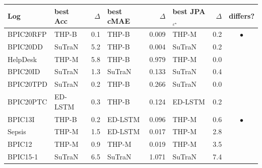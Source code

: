 \begin{tabular}{llrlrlrc}
\toprule
Log & best Acc & $\Delta$ & best cMAE & $\Delta$ & best JPA$_{\varepsilon^\star}$ & $\Delta$ & differs? \\
\midrule
BPIC20RFP & THP-B & 0.1 & THP-B & 0.009 & THP-M & 0.2 & $\bullet$ \\
BPIC20DD & SuTraN & 5.2 & THP-B & 0.004 & SuTraN & 0.2 &  \\
HelpDesk & THP-M & 5.8 & THP-B & 0.979 & THP-M & 0.0 &  \\
BPIC20ID & SuTraN & 1.3 & SuTraN & 0.133 & SuTraN & 0.4 &  \\
BPIC20TPD & SuTraN & 0.2 & THP-B & 0.266 & SuTraN & 0.0 &  \\
BPIC20PTC & ED-LSTM & 0.3 & THP-B & 0.124 & ED-LSTM & 0.2 &  \\
BPIC13I & THP-B & 0.2 & ED-LSTM & 0.096 & THP-M & 0.6 & $\bullet$ \\
Sepsis & THP-M & 1.5 & ED-LSTM & 0.017 & THP-M & 2.8 &  \\
BPIC12 & THP-M & 0.9 & THP-M & 0.019 & THP-M & 3.5 &  \\
BPIC15-1 & SuTraN & 6.5 & SuTraN & 1.071 & SuTraN & 7.4 &  \\
\bottomrule
\end{tabular}
